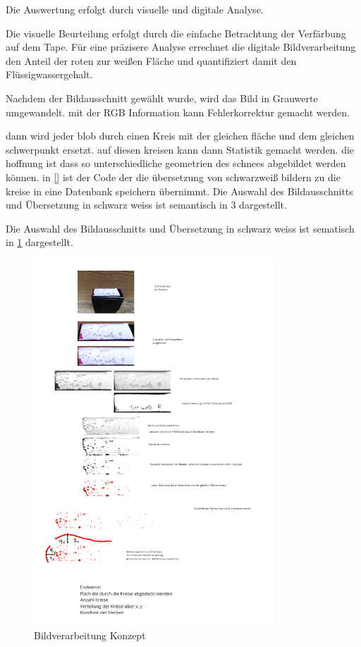 


Die Auswertung erfolgt durch visuelle und digitale Analyse.

Die visuelle Beurteilung erfolgt durch die einfache Betrachtung der Verfärbung auf dem Tape. 
Für eine präzisere Analyse errechnet die digitale Bildverarbeitung den Anteil der roten zur weißen Fläche und quantifiziert damit den Flüssigwassergehalt.

Nachdem der Bildausschnitt gewählt wurde, wird das Bild in Grauwerte umgewandelt. mit der RGB Information kann Fehlerkorrektur gemacht werden.

dann wird jeder blob durch einen Kreis mit der gleichen fläche und dem gleichen schwerpunkt ersetzt. auf diesen kreisen kann dann Statistik gemacht werden. die hoffnung ist dass so unterschiedliche geometrien des schnees abgebildet werden können. in \ref{} ist der Code der die übersetzung von schwarzweiß bildern zu die kreise in eine Datenbank speichern übernimmt.
Die Auswahl des Bildausschnitts und Übersetzung in schwarz weiss ist semantisch in 3 dargestellt.



Die Auswahl des Bildausschnitts und Übersetzung in schwarz weiss ist sematisch in \ref{fig:Bildverarbeitnugskonzpet} dargestellt.


\begin{figure}
    \centering
    \includegraphics[width=0.8\textwidth]{Bilder/Screenshotfrom2024-04-0112-59-42.png}
    \caption{Bildverarbeitung Konzept}
    \label{fig:Bildverarbeitnugskonzpet}
\end{figure}

\newpage
